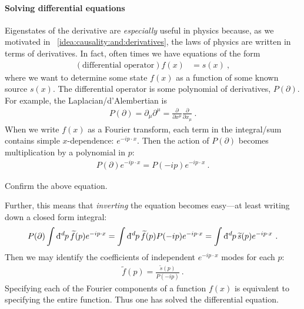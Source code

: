 \paragraph{Solving differential equations}
Eigenstates of the derivative are \emph{especially} useful in physics because, as we motivated in \bigidearef{}~\ref{idea:causality:and:derivatives}, the laws of physics are written in terms of derivatives. In fact, often times we have equations of the form 
\begin{align}
    (\text{differential operator}) f(x) &= s(x) \ ,
\end{align}
where we want to determine some state $f(x)$ as a function of some known source $s(x)$. The differential operator is some polynomial of derivatives, $P(\partial)$. For example, the Laplacian/d'Alembertian is
\begin{align}
    P(\partial) = \partial_\mu \partial^\mu = \frac{\partial}{\partial x^\mu}\frac{\partial}{\partial x_\mu} \ .
\end{align}
When we write $f(x)$ as a Fourier transform, each term in the integral/sum contains simple $x$-dependence: $e^{-ip\cdot x}$. Then the action of $P(\partial)$ becomes multiplication by a polynomial in $p$:
\begin{align}
    P(\partial) e^{-ip\cdot x}
    = 
    P(-ip) e^{-ip\cdot x} \ .
\end{align}
\begin{exercise}
Confirm the above equation. 
\end{exercise}
Further, this means that \emph{inverting} the equation becomes easy---at least writing down a closed form integral:
\begin{align}
    P(\partial) 
    \int \DDbar{d}{p}\, \tilde f(p)
    e^{-ip\cdot x}
    =
    \int \DDbar{d}{p}\, \tilde f(p) P(-ip) 
    e^{-ip\cdot x}
    = 
    \int \DDbar{d}{p}\, \tilde s(p)
    e^{-ip\cdot x} \ .
\end{align}
Then we may identify the coefficients of independent $e^{-ip\cdot x}$ modes for each $p$:
\begin{align}
    \tilde f(p) = \frac{\tilde s(p)}{P(-ip)} \ .
\end{align}
Specifying each of the Fourier components of a function $f(x)$ is equivalent to specifying the entire function. Thus one has solved the differential equation.





